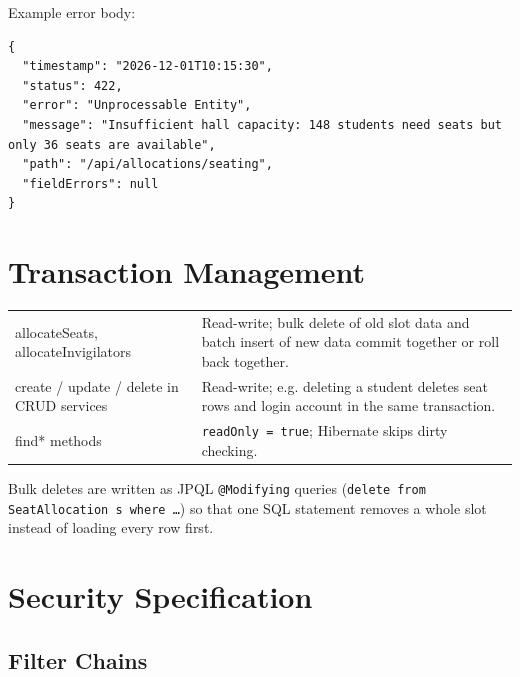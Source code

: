 \documentclass[11pt,a4paper]{article}
\newcommand{\src}{../../src/main/java/com/examgrid}
\begin{document}


\noindent Example error body:
\begin{lstlisting}[style=json]
{
  "timestamp": "2026-12-01T10:15:30",
  "status": 422,
  "error": "Unprocessable Entity",
  "message": "Insufficient hall capacity: 148 students need seats but only 36 seats are available",
  "path": "/api/allocations/seating",
  "fieldErrors": null
}
\end{lstlisting}

\section{Transaction Management}
\begin{tabularx}{\linewidth}{|L{5cm}|X|}
\hline\headrow{} & \\\hline
allocateSeats, allocateInvigilators & Read-write; bulk delete of old slot data and batch insert of new data commit together or roll back together.\\\hline
create / update / delete in CRUD services & Read-write; e.g. deleting a student deletes seat rows and login account in the same transaction.\\\hline
find* methods & \texttt{readOnly = true}; Hibernate skips dirty checking.\\\hline
\end{tabularx}
Bulk deletes are written as JPQL \texttt{@Modifying} queries (\texttt{delete from SeatAllocation s where \ldots}) so that one SQL statement removes a whole slot instead of loading every row first.

\section{Security Specification}
\subsection{Filter Chains}

\end{document}
